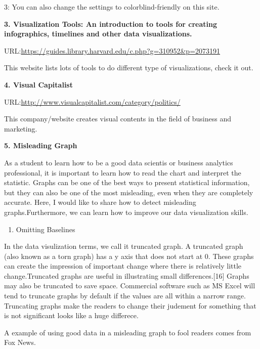 \documentclass[]{book}
\providecommand{\tightlist}{%
  \setlength{\itemsep}{0pt}\setlength{\parskip}{0pt}}
\theoremstyle{definition}
\theoremstyle{definition}
\theoremstyle{definition}
\theoremstyle{remark}
\begin{document}
3: You can also change the settings to colorblind-friendly on this site.

\textbf{3. Visualization Tools: An introduction to tools for creating
infographics, timelines and other data visualizations.}

URL:\url{https://guides.library.harvard.edu/c.php?g=310952\&p=2073191}

This website lists lots of tools to do different type of visualizations,
check it out.

\textbf{4. Visual Capitalist}

URL:\url{http://www.visualcapitalist.com/category/politics/}

This company/website creates visual contents in the field of business
and marketing.

\textbf{5. Misleading Graph}

As a student to learn how to be a good data scientis or business
analytics professional, it is important to learn how to read the chart
and interpret the statistic. Graphs can be one of the best ways to
present statistical information, but they can also be one of the most
misleading, even when they are completely accurate. Here, I would like
to share how to detect misleading graphs.Furthermore, we can learn how
to improve our data visualization skills.

\begin{enumerate}
\def\labelenumi{\arabic{enumi}.}
\tightlist
\item
  Omitting Baselines
\end{enumerate}

In the data visulization terms, we call it truncated graph. A truncated
graph (also known as a torn graph) has a y axis that does not start at
0. These graphs can create the impression of important change where
there is relatively little change.Truncated graphs are useful in
illustrating small differences.{[}16{]} Graphs may also be truncated to
save space. Commercial software such as MS Excel will tend to truncate
graphs by default if the values are all within a narrow range.
Truncating graphs make the readers to change their judement for
something that is not significant looks like a huge differece.

A example of using good data in a misleading graph to fool readers comes
from Fox News.
\end{document}
